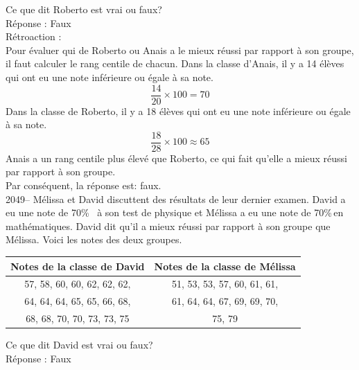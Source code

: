\documentclass[letterpaper, 12pt]{article}
\begin{document}
Ce que dit Roberto est vrai ou faux? \\

R\'eponse : Faux\\

R\'etroaction :\\
Pour \'evaluer qui de Roberto ou Anais a le mieux r\'eussi par rapport \`a son groupe, il faut calculer le rang centile de chacun. Dans la classe d'Anais, il y a 14 \'el\`eves qui ont eu une note inf\'erieure ou \'egale \`a sa note.
\begin{equation*}
 \frac{14}{20} \times 100 = 70
\end{equation*}
Dans la classe de Roberto, il y a 18 \'el\`eves qui ont eu une note inf\'erieure ou \'egale \`a sa note.
\begin{equation*}
 \frac{18}{28} \times 100 \approx 65
\end{equation*}
Anais a un rang centile plus \'elev\'e que Roberto, ce qui fait qu'elle a mieux r\'eussi par rapport \`a son groupe.\\
Par cons\'equent, la r\'eponse est: faux.\\

2049-- M\'elissa et David discuttent des r\'esultats de leur dernier examen. David a eu une note de 70\% \, \`a son test de physique et M\'elissa a eu une note de 70\%\,en math\'ematiques. David dit qu'il a mieux r\'eussi par rapport \`a son groupe que M\'elissa. Voici les notes des deux groupes.
\begin{center}
 \begin{tabular}{|c|c|} \hline
{\bf Notes de la classe de David } & {\bf Notes de la classe de M\'elissa }\\  \hline

57, 58, 60, 60, 62, 62, 62, & 51, 53, 53, 57, 60, 61, 61, \\
64, 64, 64, 65, 65, 66, 68, & 61, 64, 64, 67, 69, 69, 70, \\
68, 68, 70, 70, 73, 73, 75 & 75, 79 \\ \hline
\end{tabular}
\end{center}

Ce que dit David est vrai ou faux? \\

R\'eponse : Faux\\
\end{document}
